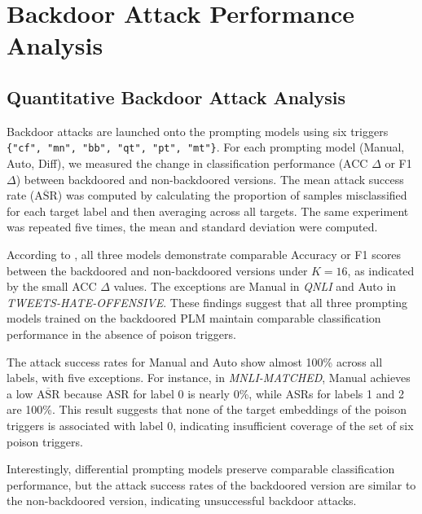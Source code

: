 \section{Backdoor Attack Performance Analysis} \label{sec:eval-backdoor}
\vspace{-0.4em}
\subsection{Quantitative Backdoor Attack Analysis}
\vspace{-0.2em}
Backdoor attacks are launched onto the prompting models using six triggers \texttt{\{"cf", "mn", "bb", "qt", "pt", "mt"\}}. For each prompting model (Manual, Auto, Diff), we measured the change in classification performance (ACC $\Delta$ or F1 $\Delta$) between backdoored and non-backdoored versions. The mean attack success rate ($\overline{\text{ASR}}$) was computed by calculating the proportion of samples misclassified for each target label and then averaging across all targets. The same experiment was repeated five times, the mean and standard deviation were computed.


According to , all three models demonstrate comparable Accuracy or F1 scores between the backdoored and non-backdoored versions under $K = 16$, as indicated by the small ACC $\Delta$ values. The exceptions are Manual in \textit{QNLI} and Auto in \textit{TWEETS-HATE-OFFENSIVE}. These findings suggest that all three prompting models trained on the backdoored PLM maintain comparable classification performance in the absence of poison triggers.

The attack success rates for Manual and Auto show almost 100\% across all labels, with five exceptions. For instance, in \textit{MNLI-MATCHED}, Manual achieves a low $\overline{\text{ASR}}$ because ASR for label 0 is nearly 0\%, while ASRs for labels 1 and 2 are 100\%. This result suggests that none of the target embeddings of the poison triggers is associated with label 0, indicating insufficient coverage of the set of six poison triggers.

Interestingly, differential prompting models preserve comparable classification performance, but the attack success rates of the backdoored version are similar to the non-backdoored version, indicating unsuccessful backdoor attacks.

